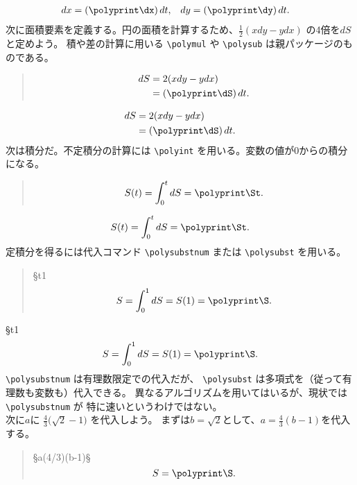 \documentclass[dvipdfmx]{jsarticle}
\begin{document}
\begin{align*}
  dx &= (\polyprint\dx)\,dt, & dy &= (\polyprint\dy)\,dt.
\end{align*}    
次に面積要素を定義する。円の面積を計算するため、$\frac12(xdy-ydx)$ の4倍を$dS$と定めよう。
積や差の計算に用いる \verb|\polymul| や \verb|\polysub| は親パッケージのものである。
\begin{quote}
\begin{boxedverbatim}
\polymul\dSA\x\dy  \polymul\dSB\y\dx
\polysub\dS\dSA\dSB \polymul{}\dS
\begin{align*}
 dS &=2(xdy-ydx)\\
    &=(\polyprint\dS)\,dt.
\end{align*}
\end{boxedverbatim}
\end{quote}
\polymul\dSA\x\dy  \polymul\dSB\y\dx
\polysub\dS\dSA\dSB  \polymul{}\dS
\begin{align*}
 dS &=2(xdy-ydx)\\
    &=(\polyprint\dS)\,dt.
\end{align*}
次は積分だ。不定積分の計算には \verb|\polyint| を用いる。変数の値が0からの積分になる。
\begin{quote}
\begin{boxedverbatim}
\polyint{}\dS
\[ S(t) = \int_0^tdS = \polyprint\St. \]
\end{boxedverbatim}
\end{quote}
\polyint{}\dS
\[ S(t) = \int_0^tdS = \polyprint\St. \]
定積分を得るには代入コマンド \verb|\polysubstnum| または  \verb|\polysubst| を用いる。
\begin{quote}
\begin{boxedverbatim}
\polysubstnum\S{t}{1}\St
\[ S = \int_0^1dS = S(1) = \polyprint\S. \]
\end{boxedverbatim}
\end{quote}
\polysubstnum\S{t}{1}\St
\[ S = \int_0^1dS = S(1) = \polyprint\S. \]
\verb|\polysubstnum| は有理数限定での代入だが、
\verb|\polysubst| は多項式を（従って有理数も変数も）代入できる。
異なるアルゴリズムを用いてはいるが、現状では \verb|\polysubstnum| が
特に速いというわけではない。
\medskip\\
次に$a$に $\frac43\bigl(\sqrt2-1\bigr)$ を代入しよう。
まずは$b=\sqrt2$として、$a=\frac43(b-1)$を代入する。
\begin{quote}
\begin{boxedverbatim}
\polysubst\S{a}{(4/3)(b-1)}\S
\[ S=\polyprint\S. \]
\end{boxedverbatim}
\end{quote}
\end{document}

